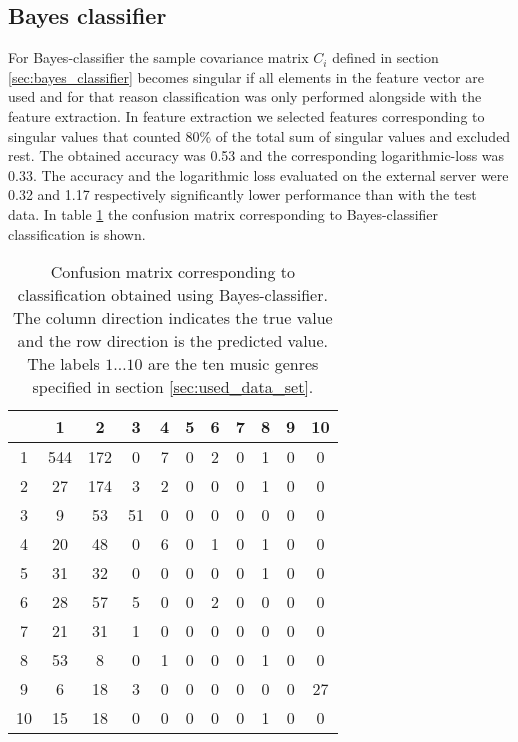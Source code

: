 \documentclass[aps,prb,10pt,twocolumn,groupedaddress]{revtex4-1}
\begin{document}
\subsection{Bayes classifier}
\label{sec:result_bayes_classifier}
For Bayes-classifier the sample covariance matrix $C_i$ defined in section
\ref{sec:bayes_classifier} becomes singular if all elements in the feature
vector are used and for that reason classification was only performed alongside
with the feature extraction. In feature extraction we selected features
corresponding to singular values that counted 80\% of the total sum of
singular values and excluded rest. The obtained accuracy was 0.53 and the
corresponding logarithmic-loss was 0.33. The accuracy and the logarithmic loss
evaluated on the external server were 0.32 and 1.17 respectively significantly
lower performance than with the test data. In table \ref{tab:confusion_bayes}
the confusion matrix corresponding to Bayes-classifier classification is shown.
\begin{center}
  \begin{table}[b]
    \caption{Confusion matrix corresponding to classification obtained using
      Bayes-classifier. The column direction indicates the true value and the
      row direction is the predicted value. The labels $1\ldots10$ are the ten
    music genres specified in section \ref{sec:used_data_set}.}
    \begin{tabular*}{0.45\textwidth}{@{\extracolsep{\fill}}c|cccccccccc}
        & 1 & 2 & 3 & 4 & 5 & 6 & 7 & 8 & 9 & 10\\
      \hline
      1 & 544 & 172 & 0 & 7 & 0 & 2 & 0 & 1 & 0 & 0\\
      2 & 27 & 174 & 3 & 2 & 0 & 0 & 0 & 1 & 0 & 0\\
      3 & 9 & 53 & 51 & 0 & 0 & 0 & 0 & 0 & 0 & 0 \\
      4 & 20 & 48 & 0 & 6 & 0 & 1 & 0 & 1 & 0 & 0 \\
      5 & 31 & 32 & 0 & 0 & 0 & 0 & 0 & 1 & 0 & 0 \\
      6 & 28 & 57 & 5 & 0 & 0 & 2 & 0 & 0 & 0 & 0 \\
      7 & 21 & 31 & 1 & 0 & 0 & 0 & 0 & 0 & 0 & 0 \\
      8 & 53 & 8 & 0 & 1 & 0 & 0 & 0 & 1 & 0 & 0 \\
      9 & 6 & 18 & 3 & 0 & 0 & 0 & 0 & 0 & 0 & 27 \\
      10 & 15 & 18 & 0 & 0 & 0 & 0 & 0 & 1 & 0 & 0\\
      \end{tabular*}
    \label{tab:confusion_bayes}
  \end{table}
\end{center}
\end{document}
